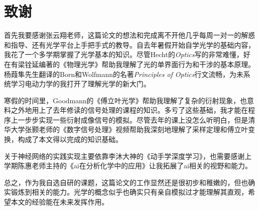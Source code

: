 \documentclass[draft=false,oneside]{fduthesis}
\begin{document}
    \chapter*{致谢}
    首先我要感谢张云翔老师，这篇论文的想法和完成离不开他几乎每周一对一的解惑和指导、还有光学平台上手把手式的教导。自去年暑假开始自学光学的基础内容，我花了一个多学期掌握了光学基本的知识。尽管Hecht的\textit{Optics}写的非常难懂，好在有梁铨延编著的《物理光学》帮助我理解了光的单界面行为和干涉的基本原理。杨葭隼先生翻译的Born和Wolfmann的名著\textit{Principles of Optics}行文流畅，为未系统学习电动力学的我打开了理解光学的新大门。
    \par 寒假的时间里，Goodmann的《傅立叶光学》帮助我理解了复杂的衍射现象，也意料之外地用上了去年修读的信号处理的课程的知识。多亏了这些基础，我才能在程序上一步步实现一些衍射成像信号的模拟。尽管去年的课上没怎么听明白，但是清华大学张颢老师的《数字信号处理》视频帮助我深刻地理解了采样定理和傅立叶变换，构成了本文得以完成的知识基础。
    \par 关于神经网络的实践实现主要依靠李沐大神的《动手学深度学习》，也需要感谢上学期陈惠老师主持的《ai在分析化学中的应用》让我拓展了ai相关的视野和能力。
    \par 总之，作为我自选自研的课题，这篇论文的工作显然还是很初步和稚嫩的，但也确实锻炼到相关的能力。光学的概念似乎也确实只有亲自模拟过才能理解其直观，希望本文的经验能在未来发挥作用。
\end{document}
